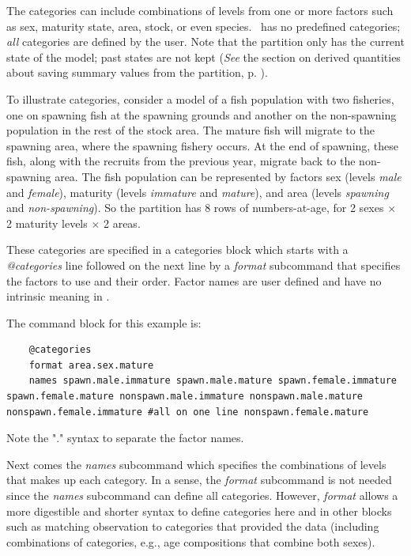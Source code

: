 The categories can include combinations of levels from one or more factors such as sex, maturity state, area, stock, or even species. \CNAME\ has no predefined categories; \emph{all} categories are defined by the user. Note that the partition only has the current state of the model; past states are not kept (\textit{See} the section on derived quantities about saving summary values from the partition, p. \pageref{sec:DerivedQuantity}).

To illustrate categories, consider a model of a fish population with two fisheries, one on spawning fish at the spawning grounds and another on the non-spawning population in the rest of the stock area. The mature fish will migrate to the spawning area, where the spawning fishery occurs. At the end of spawning, these fish, along with the recruits from the previous year, migrate back to the non-spawning area. The fish population can be represented  by factors sex (levels \textit{male} and \textit{female}), maturity (levels \textit{immature} and \textit{mature}), and area (levels \textit{spawning} and \textit{non-spawning}). So the partition has 8 rows of numbers-at-age, for 2 sexes $\times$ 2 maturity levels $\times$ 2 areas.

These categories are specified in a categories block which starts with a \textit{@categories} line followed on the next line by a \textit{format} subcommand that specifies the factors to use and their order. Factor names are user defined and have no intrinsic meaning in \CNAME.

The command block for this example is:

{\small{\begin{lstlisting}
	@categories
	format area.sex.mature
	names spawn.male.immature spawn.male.mature spawn.female.immature spawn.female.mature nonspawn.male.immature nonspawn.male.mature nonspawn.female.immature #all on one line nonspawn.female.mature
\end{lstlisting}}}  %

Note the "." syntax to separate the factor names.

Next comes the \textit{names} subcommand which specifies the combinations of levels that makes up each category. In a sense, the \textit{format} subcommand is not needed since the \textit{names} subcommand can define all categories. However, \textit{format} allows a more  digestible and shorter syntax to define categories here and in other blocks such as matching observation to categories that provided the data (including combinations of categories, e.g., age compositions that combine both sexes).

